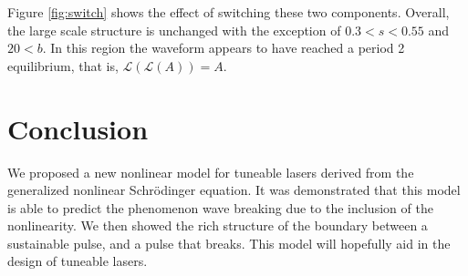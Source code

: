\documentclass[%
 aps,
 jmp,%
 amsmath,amssymb,
 reprint,%
nofootinbib
]{revtex4-1}
\begin{document}
Figure \ref{fig:switch} shows the effect of switching these two components. Overall, the large scale structure is unchanged with the exception of $0.3 < s < 0.55$ and $20 < b$. In this region the waveform appears to have reached a period 2 equilibrium, that is, $\mathcal{L}(\mathcal{L}(A)) = A$.

\begin{figure*}
\centering
\begin{subfigure}[]{0.5\textwidth}

\end{subfigure}%
\begin{subfigure}[]{0.5\textwidth}

\end{subfigure}
\caption{Regions of convergence with modulation preceding dispersion, same parameters as Figure \ref{fig:DMmap}.}
\label{fig:switch}
\end{figure*}

\section{Conclusion}

We proposed a new nonlinear model for tuneable lasers derived from the generalized nonlinear Schr\"{o}dinger equation. It was demonstrated that this model is able to predict the phenomenon wave breaking due to the inclusion of the nonlinearity. We then showed the rich structure of the boundary between a sustainable pulse, and a pulse that breaks. This model will hopefully aid in the design of tuneable lasers.
\newpage



\end{document}
